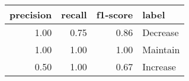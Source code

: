 \begin{tabular}{rrrl}
\toprule
precision & recall & f1-score & label \\
\midrule
1.00 & 0.75 & 0.86 & Decrease \\
1.00 & 1.00 & 1.00 & Maintain \\
0.50 & 1.00 & 0.67 & Increase \\
\bottomrule
\end{tabular}
